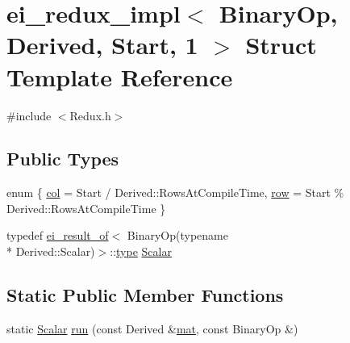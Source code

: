 \hypertarget{structei__redux__impl_3_01_binary_op_00_01_derived_00_01_start_00_011_01_4}{\section{ei\-\_\-redux\-\_\-impl$<$ Binary\-Op, Derived, Start, 1 $>$ Struct Template Reference}
\label{structei__redux__impl_3_01_binary_op_00_01_derived_00_01_start_00_011_01_4}
}


{\ttfamily \#include $<$Redux.\-h$>$}

\subsection*{Public Types}
\begin{DoxyCompactItemize}
\item 
enum \{ \hyperlink{structei__redux__impl_3_01_binary_op_00_01_derived_00_01_start_00_011_01_4_a01a67cf6281b1975b95af12e9bb62274a8eb0cfa0457728a43a67d9636ae426a3}{col} = Start / Derived\-:\-:Rows\-At\-Compile\-Time, 
\hyperlink{structei__redux__impl_3_01_binary_op_00_01_derived_00_01_start_00_011_01_4_a01a67cf6281b1975b95af12e9bb62274ad3849c1969ee413df237edc2f8f3a306}{row} = Start \% Derived\-:\-:Rows\-At\-Compile\-Time
 \}
\item 
typedef \hyperlink{structei__result__of}{ei\-\_\-result\-\_\-of}$<$ Binary\-Op(typename \\*
Derived\-::\-Scalar)$>$\-::\hyperlink{glext_8h_a7d05960f4f1c1b11f3177dc963a45d86}{type} \hyperlink{structei__redux__impl_3_01_binary_op_00_01_derived_00_01_start_00_011_01_4_af587343d1e77970e1f81a5cc947c15f2}{Scalar}
\end{DoxyCompactItemize}
\subsection*{Static Public Member Functions}
\begin{DoxyCompactItemize}
\item 
static \hyperlink{structei__redux__impl_3_01_binary_op_00_01_derived_00_01_start_00_011_01_4_af587343d1e77970e1f81a5cc947c15f2}{Scalar} \hyperlink{structei__redux__impl_3_01_binary_op_00_01_derived_00_01_start_00_011_01_4_aa85520037fc6fb7f99ceaace10858068}{run} (const Derived \&\hyperlink{uavobjecttemplate_8m_a16a51e808b16c46bbfd36da2e37cd123}{mat}, const Binary\-Op \&)
\end{DoxyCompactItemize}


